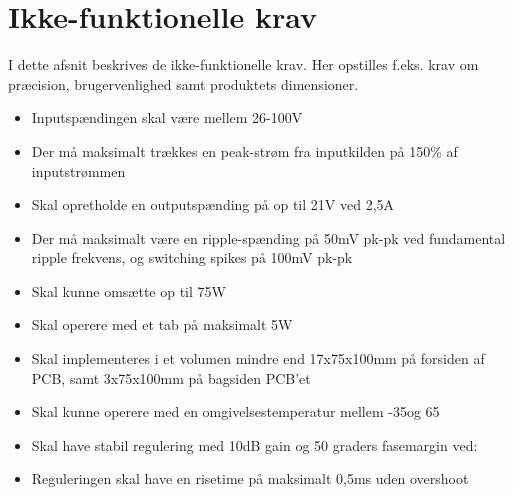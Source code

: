 \clearpage

\section{Ikke-funktionelle krav}
I dette afsnit beskrives de ikke-funktionelle krav. Her opstilles f.eks. krav om præcision, brugervenlighed samt produktets dimensioner.
\begin{itemize}
			\item Inputspændingen skal være mellem 26-100V
			\item Der må maksimalt trækkes en peak-strøm fra inputkilden på 150\% af inputstrømmen
			\item Skal opretholde en outputspænding på op til 21V ved 2,5A
			\item Der må maksimalt være en ripple-spænding på 50mV pk-pk ved fundamental ripple frekvens, og switching spikes på 100mV pk-pk
			\item Skal kunne omsætte op til 75W
			\item Skal operere med et tab på maksimalt 5W %
			\item Skal implementeres i et volumen mindre end 17x75x100mm på forsiden af PCB, samt 3x75x100mm på bagsiden PCB'et
			\item Skal kunne operere med en omgivelsestemperatur mellem -35\degreeCelsius  og 65\degreeCelsius
			\item Skal have stabil regulering med 10dB gain og 50 graders fasemargin ved:
			\item Reguleringen skal have en risetime på maksimalt 0,5ms uden overshoot
					
\end{itemize}
